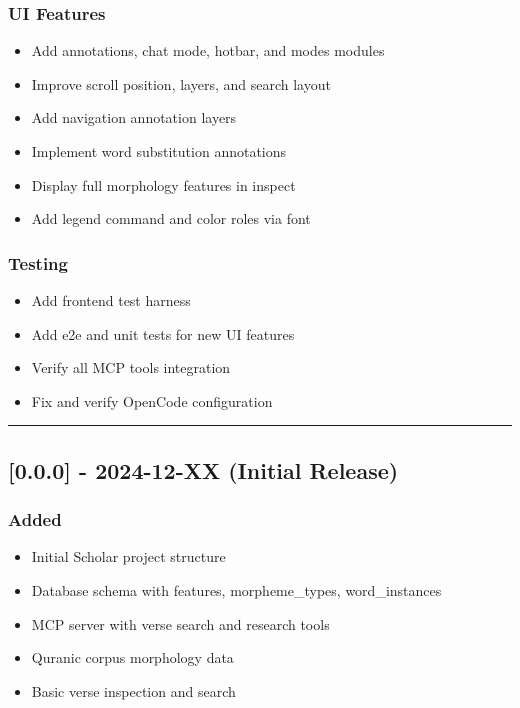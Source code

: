\documentclass[12pt,a4paper]{article}
\providecommand{\tightlist}{\setlength{\itemsep}{0pt}\setlength{\parskip}{0pt}}
\begin{document}
\subsubsection{UI Features}\label{ui-features}

\begin{itemize}
\tightlist
\item
  Add annotations, chat mode, hotbar, and modes modules
\item
  Improve scroll position, layers, and search layout
\item
  Add navigation annotation layers
\item
  Implement word substitution annotations
\item
  Display full morphology features in inspect
\item
  Add legend command and color roles via font
\end{itemize}

\subsubsection{Testing}\label{testing}

\begin{itemize}
\tightlist
\item
  Add frontend test harness
\item
  Add e2e and unit tests for new UI features
\item
  Verify all MCP tools integration
\item
  Fix and verify OpenCode configuration
\end{itemize}

\begin{center}\rule{0.5\linewidth}{0.5pt}\end{center}

\subsection{{[}0.0.0{]} - 2024-12-XX (Initial
Release)}\label{xx-initial-release}

\subsubsection{Added}\label{added-1}

\begin{itemize}
\tightlist
\item
  Initial Scholar project structure
\item
  Database schema with features, morpheme\_types, word\_instances
\item
  MCP server with verse search and research tools
\item
  Quranic corpus morphology data
\item
  Basic verse inspection and search
\end{itemize}
\end{document}
